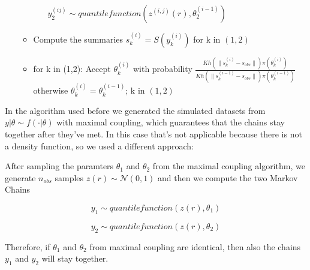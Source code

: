 \documentclass[11pt,a4paper,oneside]{report}
\begin{document}
\begin{enumerate}
\begin{itemize}
\begin{itemize}
		$ y_{2}^{(ij)} \sim quantile function(z^{(i,j)}(r), \theta_{2}^{(i-1)})$
		
	\end{itemize}
	
	\item Compute the summaries  $ s_{k}^{(i)} =S(y_{k}^{(i)})$ for k in $ (1,2) $
	
	
	\item for k in (1,2):
 Accept $\theta_{k}^{(i)}$ with probability $\frac{Kh(\|s_{k}^{(i)}-s_{obs}\|)\pi(\theta_{k}^{(i)})}{Kh(\|s_{k}^{(i-1)}- s_{obs}\|)\pi(\theta_{k}^{(i-1)})} $   otherwise $\theta_{k}^{(i)}=\theta_{k}^{(i-1)}$; k in $ (1,2)$
		

\end{itemize}

\end{enumerate}


In the algorithm used before we generated the simulated datasets from $ y| \theta \sim f(\cdot| \theta)$ with maximal coupling, which guarantees that the chains stay together after they've met.
In this case that's not applicable because there is not a density function, so we used a different approach:

After sampling the paramters $\theta_{1} $ and $ \theta_{2}$ from the maximal coupling algorithm, we generate $n_{obs}$ samples $z(r) \sim \mathcal{N}(0,1)$
and then we compute the two Markov Chains

$$ y_{1} \sim quantile function(z(r), \theta_{1})$$

$$ y_{2} \sim quantile function(z(r),\theta_{2})$$ 

Therefore, if $\theta_{1}  $ and $  \theta_{2}$ from maximal coupling are identical, then also the chains $y_{1} $ and $  y_{2}$ will stay together.

\newpage
\printbibliography[heading=bibintoc]


\end{document}
